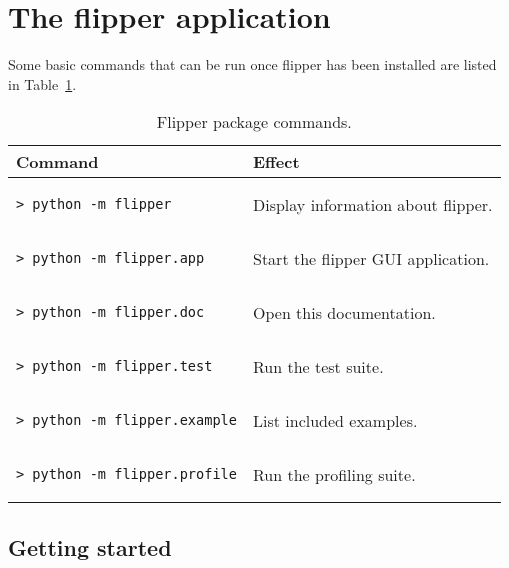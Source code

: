 \documentclass[a4paper]{article}
\begin{document}
\section{The flipper application}

Some basic commands that can be run once flipper has been installed are listed in Table~\ref{tbl:package_commands}.

\begin{table}[ht]
\label{tbl:package_commands}
\begin{center}
\begin{tabular}{l|l}
Command & Effect \\
\hline
\begin{lstlisting}
> python -m flipper
\end{lstlisting} & Display information about flipper. \\

\begin{lstlisting}
> python -m flipper.app
\end{lstlisting} & Start the flipper GUI application. \\

\begin{lstlisting}
> python -m flipper.doc
\end{lstlisting} & Open this documentation. \\

\begin{lstlisting}
> python -m flipper.test
\end{lstlisting} & Run the test suite. \\

\begin{lstlisting}
> python -m flipper.example
\end{lstlisting} & List included examples. \\

\begin{lstlisting}
> python -m flipper.profile
\end{lstlisting} & Run the profiling suite. \\
\end{tabular}
\end{center}
\caption{Flipper package commands.}
\end{table}

\subsection{Getting started}
\end{document}
